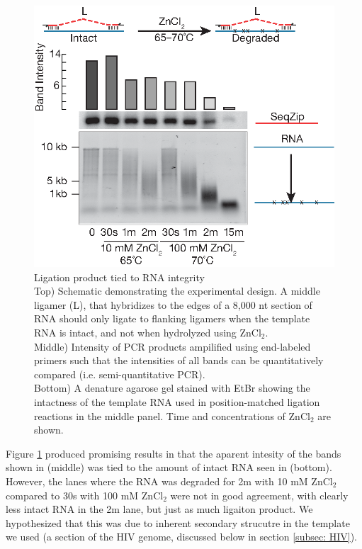 	  \begin{figure}[htbp] %
    	\centering 
    	\includegraphics{Figures/Chapter2/DegreadedRNABySeqZip.eps}
    	\caption[Ligation product tied to RNA integrity]
    	{
		    Ligation product tied to RNA integrity\\
      	Top) Schematic demonstrating the experimental design. A middle ligamer (L), that hybridizes to the edges of a 8,000 nt section of RNA should only ligate to flanking ligamers when the template RNA is intact, and not when hydrolyzed using ZnCl$_{2}$. \\
        Middle) Intensity of PCR products ampilified using end-labeled primers such that the intensities of all bands can be quantitatively compared (i.e. semi-quantitative PCR). \\
        Bottom) A denature agarose gel stained with EtBr showing the intactness of the template RNA used in position-matched ligation reactions in the middle panel. Time and concentrations of ZnCl$_{2}$ are shown.
    		}
    	\label{fig:Ligation product and RNA integrity}
  		\end{figure}

    Figure \ref{fig:Ligation product and RNA integrity} produced promising results in that the aparent intesity of the bands shown in (middle) was tied to the amount of intact RNA seen in (bottom). However, the lanes where the RNA was degraded for 2m with 10 mM ZnCl$_{2}$ compared to 30s with 100 mM ZnCl$_{2}$ were not in good agreement, with clearly less intact RNA in the 2m lane, but just as much ligaiton product. We hypothesized that this was due to inherent secondary strucutre in the template we used (a section of the HIV genome, discussed below in section \ref{subsec: HIV}). 

